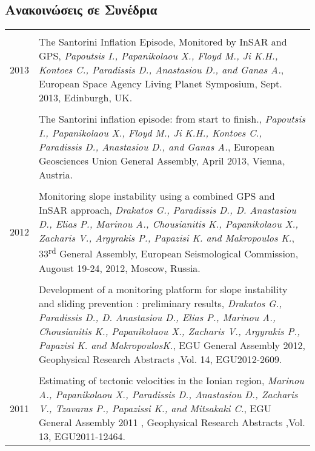 \documentclass[a4paper,10pt]{article} %
\begin{document}
\subsection*{Ανακοινώσεις σε Συνέδρια}

\begin{longtable}{r|p{14cm}}
\multicolumn{2}{c}{} \\ 
  \textsc{2013}
  & The Santorini Inflation Episode, Monitored by InSAR and GPS,
  \emph{Papoutsis I., Papanikolaou X., Floyd M., Ji K.H., Kontoes C., Paradissis D., Anastasiou D., and Ganas A.},
  European Space Agency Living Planet Symposium, Sept. 2013, Edinburgh, UK.\\

  &\\

  & The Santorini inflation episode: from start to finish.,
  \emph{Papoutsis I., Papanikolaou X., Floyd M., Ji K.H., Kontoes C., Paradissis D., Anastasiou D., and Ganas A.},
  European Geosciences Union General Assembly, April 2013, Vienna, Austria.\\

\multicolumn{2}{c}{} \\
  \textsc{2012}
  & Monitoring slope instability using a combined GPS and InSAR approach,
  \emph{Drakatos G., Paradissis D., D. Anastasiou D., Elias P., Marinou A., Chousianitis K., Papanikolaou X., Zacharis V., Argyrakis P., Papazisi K. and Makropoulos K.},
  33\textsuperscript{rd} General Assembly, European Seismological Commission, Augoust 19-24, 2012, Moscow, Russia.\\

  &\\

  & Development of a monitoring platform for slope instability and sliding prevention : preliminary results,
  \emph{Drakatos G., Paradissis D., D. Anastasiou D., Elias P., Marinou A., Chousianitis K., Papanikolaou X., Zacharis V., Argyrakis P., Papazisi K. and MakropoulosK.},
  EGU General Assembly 2012, Geophysical Research Abstracts ,Vol. 14, EGU2012-2609.\\

\multicolumn{2}{c}{} \\
  \textsc{2011}
  & Estimating of tectonic velocities in the Ionian region, 
  \emph{Marinou Α., Papanikolaou X., Paradissis D., Anastasiou D., Zacharis V., Tzavaras P., Papazissi K., and Mitsakaki C.},
  EGU General Assembly 2011 , Geophysical Research Abstracts ,Vol. 13, EGU2011-12464.\\


\end{longtable}
\end{document}
